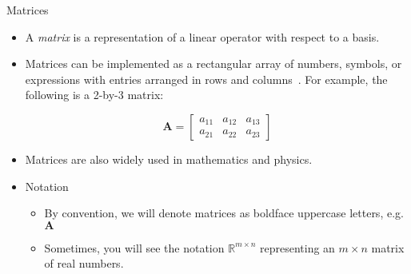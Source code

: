 \documentclass[aspectratio=169,xcolor=dvipsnames]{beamer}
\begin{document}
\begin{frame}{Matrices}

\begin{itemize}
      \item A \textit{matrix} is a representation of a linear operator with respect to a basis.
      \item Matrices can be implemented as a rectangular array of numbers, symbols, or expressions
      with entries arranged in rows and columns~\cite{Wikipedia_Matrix_2025}. For
      example, the following is a 2-by-3 matrix: 
      
      $$\mathbf{A} = 
      \begin{bmatrix}
        a_{11} & a_{12} & a_{13} \\
        a_{21} & a_{22} & a_{23}
      \end{bmatrix}$$
      \item Matrices are also widely used in mathematics and physics.
      \item Notation
            \begin{itemize}
                  \item By convention, we will denote matrices as boldface
                        uppercase letters, e.g. $\mathbf{A}$
                  \item Sometimes, you will see the notation $\mathbb{R}^{m\times n}$
                        representing an $m \times n$ matrix of real numbers.
            \end{itemize}
\end{itemize}

\end{frame}

\end{document}
